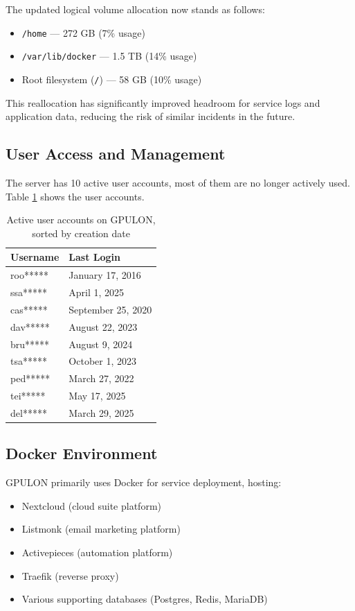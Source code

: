 The updated logical volume allocation now stands as follows:

\begin{itemize}
    \item \texttt{/home} — 272 GB (7\% usage)
    \item \texttt{/var/lib/docker} — 1.5 TB (14\% usage)
    \item Root filesystem (\texttt{/}) — 58 GB (10\% usage)
\end{itemize}

This reallocation has significantly improved headroom for service logs and application data, reducing the risk of similar incidents in the future.

\subsection*{User Access and Management}

The server has 10 active user accounts, most of them are no longer actively used. Table \ref{tab:gpulon_users} shows the user accounts.

\begin{table}[H]
  \centering
  \caption{Active user accounts on GPULON, sorted by creation date}
  \label{tab:gpulon_users}
  \begin{tabular}{ll}
    \rowcolor{udcpink!25}
    \textbf{Username} & \textbf{Last Login} \\
    \hline
    roo***** & January 17, 2016 \\
    ssa***** & April 1, 2025 \\
    cas***** & September 25, 2020 \\
    dav***** & August 22, 2023 \\
    bru***** & August 9, 2024 \\
    tsa***** & October 1, 2023 \\
    ped***** & March 27, 2022 \\
    tei***** & May 17, 2025 \\
    del***** & March 29, 2025 \\
  \end{tabular}
\end{table}

\subsection*{Docker Environment}

GPULON primarily uses Docker for service deployment, hosting:
\begin{itemize}
  \item Nextcloud (cloud suite platform)
  \item Listmonk (email marketing platform)
  \item Activepieces (automation platform)
  \item Traefik (reverse proxy)
  \item Various supporting databases (Postgres, Redis, MariaDB)
\end{itemize}

